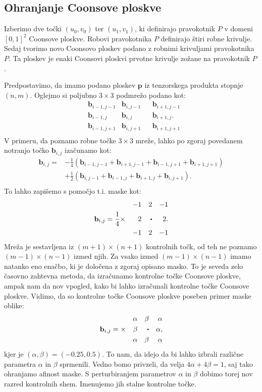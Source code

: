\documentclass[a4paper,12pt]{article}
\begin{document}
\subsection{Ohranjanje Coonsove ploskve}

Izberimo dve točki $(u_0, v_0)$ ter $(u_1,v_1)$, ki definirajo pravokotnik $P$
v domeni $[0,1]^2$ Coonsove ploskve. 
Robovi pravokotnika $P$ definirajo štiri robne krivulje.
Sedaj tvorimo novo Coonsovo ploskev podano z robnimi krivuljami pravokotnika $P$.
Ta ploskev je enaki Coonsovi ploskvi prvotne krivulje zožane na pravokotnik $P$.

Predpostavimo, da imamo podano ploskev $\mathbf{p}$ iz tenzorskega produkta stopnje $(n,m)$.
Oglejmo si poljubno $3\times 3$ podmrežo podano kot:
\begin{align*}
      &\mathbf{b}_{i-1,j-1} &\mathbf{b}_{i,j-1}& &\mathbf{b}_{i+1,j-1} \\
      &\mathbf{b}_{i-1,j} &\mathbf{b}_{i,j}& &\mathbf{b}_{i+1,j}. \\
      &\mathbf{b}_{i-1,j+1} &\mathbf{b}_{i,j+1}& &\mathbf{b}_{i+1,j+1} \\ 
\end{align*}
V primeru, da poznamo robne točke $3\times 3$ mreže, lahko po zgoraj povedanem
notranjo točko $\mathbf{b}_{i,j}$ izačunamo kot:
\begin{align*}
   \mathbf{b}_{i,j} =&-\frac{1}{4}(\mathbf{b}_{i-1,j-1}+\mathbf{b}_{i+1,j-1}+\mathbf{b}_{i-1,j+1}+\mathbf{b}_{i+1,j+1}) \\
   &+\frac{1}{2}(\mathbf{b}_{i,j-1}+\mathbf{b}_{i-1,j}+\mathbf{b}_{i+1,j}+\mathbf{b}_{i,j+1}).\\
\end{align*}
To lahko zapišemo s pomočjo t.i. maske kot:
\begin{align*}
                                        & &-1  & &2 & &-1 \\
   &\mathbf{b}_{i,j}=\frac{1}{4} \times & 2 & & \sbullet & & 2 .\\
                                        & &-1 & &2 & &-1 \\ 
\end{align*}
Mreža je sestavljena iz $(m+1)\times(n+1)$ kontrolnih točk, od teh ne poznamo 
$(m-1)\times(n-1)$ izmed njih. 
Za vsako izmed $(m-1)\times(n-1)$ imamo natanko eno enačbo, ki je določena z zgoraj opisano masko.
To je seveda zelo časovno zahtevna metoda, da izračunamo kontrolne točke Coonsove ploskve,
ampak nam da nov vpogled, kako bi lahko izračunali kontrolne točke Coonsove ploskve.
Vidimo, da so kontrolne točke Coonsove ploskve poseben primer maske oblike:
\begin{align*}
   & &\alpha  & &\beta & &\alpha \\
&\mathbf{b}_{i,j}= \times & \beta & & \sbullet & & \alpha,\\
   & &\alpha & &\beta & &\alpha \\ 
\end{align*}
kjer je $(\alpha, \beta) = (-0.25, 0.5)$. To nam, da idejo da bi lahko izbrali različne 
parametra $\alpha$ in $\beta$ sprmenili. Vedno bomo privzeli, da velja $4\alpha + 4\beta = 1$, saj 
tako ohranjamo afinost maske. S perturbiranjem parametrov 
$\alpha$ in $\beta$ dobimo torej nov razred kontrolnih shem. 
Imenujemo jih stalne kontrolne točke.
\end{document}
